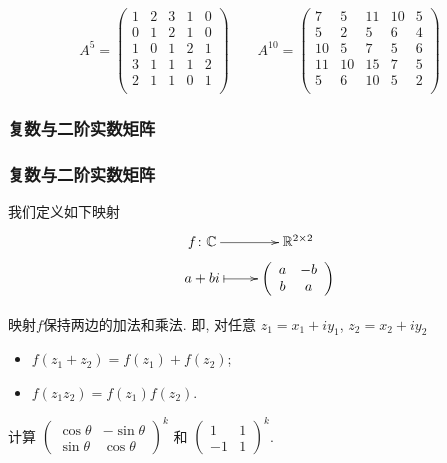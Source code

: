 \begin{frame}
\[A^5 = \begin{pmatrix}
1&2&3&1&0\\
0&1&2&1&0\\
1&0&1&2&1\\
3&1&1&1&2\\
2&1&1&0&1\\
\end{pmatrix}
\qquad
A^{10} = \begin{pmatrix}
 7& 5& 11& 10& 5\\
 5& 2& 5& 6& 4\\
 10& 5& 7& 5& 6\\
 11& 10& 15& 7& 5\\
 5& 6& 10& 5& 2\\
\end{pmatrix}
\]
\end{frame}




\renewcommand{\mydate}{2025年3月11号\quad 第五次课}




\subsubsection{复数与二阶实数矩阵}
\begin{frame}\frametitle{复数与二阶实数矩阵}
我们定义如下映射
\begin{equation*}
\xymatrix@R=1mm{
f\colon \mathbb C \ar[r]& \mathbb R^{2\times 2} \\
a+bi \ar@{|->}[r] & {\left(\begin{array}{cc}a&-b\\b&a\\\end{array}\right)} \\
}
\end{equation*}
\pp
\begin{lemma} 映射$f$保持两边的加法和乘法. \pp 即, 对任意 $z_1=x_1+iy_1$, $z_2=x_2+iy_2$
\begin{itemize}
\item $f(z_1+z_2)=f(z_1)+f(z_2)$;
\item $f(z_1z_2)=f(z_1)f(z_2)$.
\end{itemize}
\end{lemma}
\pp
\begin{example}
计算 $\begin{pmatrix}\cos\theta&-\sin\theta\\\sin\theta&\cos\theta\end{pmatrix}^k$ 和 $\begin{pmatrix}1&1\\-1&1\end{pmatrix}^k$.
\end{example}
\end{frame}






